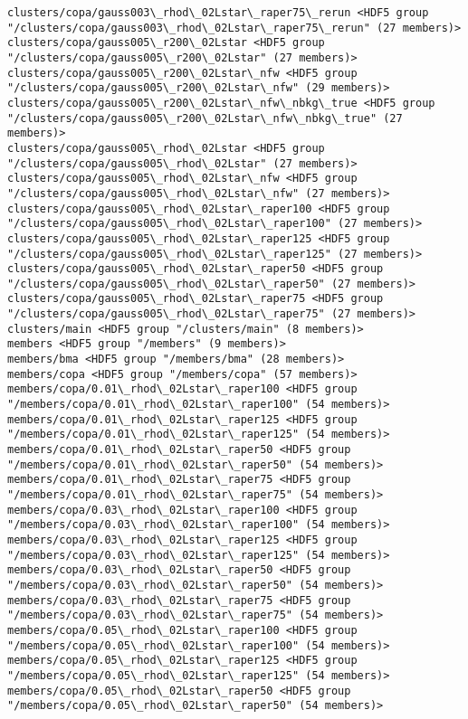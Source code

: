 \documentclass[11pt]{article}
\begin{document}
\begin{Verbatim}[commandchars=\\\{\}]
clusters/copa/gauss003\_rhod\_02Lstar\_raper75\_rerun <HDF5 group "/clusters/copa/gauss003\_rhod\_02Lstar\_raper75\_rerun" (27 members)>
clusters/copa/gauss005\_r200\_02Lstar <HDF5 group "/clusters/copa/gauss005\_r200\_02Lstar" (27 members)>
clusters/copa/gauss005\_r200\_02Lstar\_nfw <HDF5 group "/clusters/copa/gauss005\_r200\_02Lstar\_nfw" (29 members)>
clusters/copa/gauss005\_r200\_02Lstar\_nfw\_nbkg\_true <HDF5 group "/clusters/copa/gauss005\_r200\_02Lstar\_nfw\_nbkg\_true" (27 members)>
clusters/copa/gauss005\_rhod\_02Lstar <HDF5 group "/clusters/copa/gauss005\_rhod\_02Lstar" (27 members)>
clusters/copa/gauss005\_rhod\_02Lstar\_nfw <HDF5 group "/clusters/copa/gauss005\_rhod\_02Lstar\_nfw" (27 members)>
clusters/copa/gauss005\_rhod\_02Lstar\_raper100 <HDF5 group "/clusters/copa/gauss005\_rhod\_02Lstar\_raper100" (27 members)>
clusters/copa/gauss005\_rhod\_02Lstar\_raper125 <HDF5 group "/clusters/copa/gauss005\_rhod\_02Lstar\_raper125" (27 members)>
clusters/copa/gauss005\_rhod\_02Lstar\_raper50 <HDF5 group "/clusters/copa/gauss005\_rhod\_02Lstar\_raper50" (27 members)>
clusters/copa/gauss005\_rhod\_02Lstar\_raper75 <HDF5 group "/clusters/copa/gauss005\_rhod\_02Lstar\_raper75" (27 members)>
clusters/main <HDF5 group "/clusters/main" (8 members)>
members <HDF5 group "/members" (9 members)>
members/bma <HDF5 group "/members/bma" (28 members)>
members/copa <HDF5 group "/members/copa" (57 members)>
members/copa/0.01\_rhod\_02Lstar\_raper100 <HDF5 group "/members/copa/0.01\_rhod\_02Lstar\_raper100" (54 members)>
members/copa/0.01\_rhod\_02Lstar\_raper125 <HDF5 group "/members/copa/0.01\_rhod\_02Lstar\_raper125" (54 members)>
members/copa/0.01\_rhod\_02Lstar\_raper50 <HDF5 group "/members/copa/0.01\_rhod\_02Lstar\_raper50" (54 members)>
members/copa/0.01\_rhod\_02Lstar\_raper75 <HDF5 group "/members/copa/0.01\_rhod\_02Lstar\_raper75" (54 members)>
members/copa/0.03\_rhod\_02Lstar\_raper100 <HDF5 group "/members/copa/0.03\_rhod\_02Lstar\_raper100" (54 members)>
members/copa/0.03\_rhod\_02Lstar\_raper125 <HDF5 group "/members/copa/0.03\_rhod\_02Lstar\_raper125" (54 members)>
members/copa/0.03\_rhod\_02Lstar\_raper50 <HDF5 group "/members/copa/0.03\_rhod\_02Lstar\_raper50" (54 members)>
members/copa/0.03\_rhod\_02Lstar\_raper75 <HDF5 group "/members/copa/0.03\_rhod\_02Lstar\_raper75" (54 members)>
members/copa/0.05\_rhod\_02Lstar\_raper100 <HDF5 group "/members/copa/0.05\_rhod\_02Lstar\_raper100" (54 members)>
members/copa/0.05\_rhod\_02Lstar\_raper125 <HDF5 group "/members/copa/0.05\_rhod\_02Lstar\_raper125" (54 members)>
members/copa/0.05\_rhod\_02Lstar\_raper50 <HDF5 group "/members/copa/0.05\_rhod\_02Lstar\_raper50" (54 members)>

\end{Verbatim}
\end{document}
